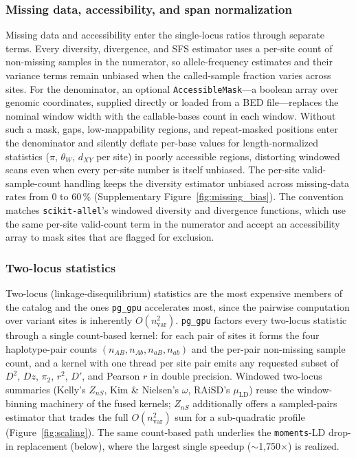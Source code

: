 \documentclass[12pt]{article}
\newcommand{\pggpu}{\texttt{pg\_gpu}\xspace}
\newcommand{\scikitallel}{\texttt{scikit-allel}\xspace}
\newcommand{\moments}{\texttt{moments}\xspace}
\begin{document}
\subsubsection*{Missing data, accessibility, and span normalization}

Missing data and accessibility enter the single-locus ratios through
separate terms. Every diversity, divergence, and SFS estimator uses a
per-site count of non-missing samples in the numerator, so
allele-frequency estimates and their variance terms remain unbiased
when the called-sample fraction varies across sites. For the
denominator, an optional \texttt{AccessibleMask}---a boolean array over
genomic coordinates, supplied directly or loaded from a BED
file---replaces the nominal window width with the callable-bases count
in each window. Without such a mask, gaps, low-mappability regions, and
repeat-masked positions enter the denominator and silently deflate
per-base values for length-normalized statistics ($\pi$, $\theta_W$,
$d_{XY}$ per site) in poorly accessible regions, distorting windowed
scans even when every per-site number is itself unbiased. The per-site
valid-sample-count handling keeps the diversity estimator unbiased
across missing-data rates from 0 to 60\,\% (Supplementary
Figure~\ref{fig:missing_bias}). The convention matches
\scikitallel's windowed diversity and divergence functions, which
use the same per-site valid-count term in the numerator and accept
an accessibility array to mask sites that are flagged for exclusion.

\subsubsection*{Two-locus statistics}

Two-locus (linkage-disequilibrium) statistics are the most expensive
members of the catalog and the ones \pggpu accelerates most, since the
pairwise computation over variant sites is inherently
$O(n_{\mathrm{var}}^2)$. \pggpu factors every two-locus statistic
through a single count-based kernel: for each pair of sites it forms
the four haplotype-pair counts $(n_{AB}, n_{Ab}, n_{aB}, n_{ab})$ and
the per-pair non-missing sample count, and a kernel with one thread per
site pair emits any requested subset of $D^2$, $Dz$, $\pi_2$, $r^2$,
$D'$, and Pearson $r$ in double precision. Windowed two-locus summaries
(Kelly's $Z_{nS}$, Kim \& Nielsen's $\omega$, RAiSD's $\mu_{\mathrm{LD}}$)
reuse the window-binning machinery of the fused kernels; $Z_{nS}$
additionally offers a sampled-pairs estimator that trades the full
$O(n_{\mathrm{var}}^2)$ sum for a sub-quadratic profile
(Figure~\ref{fig:scaling}). The same count-based path underlies the
\moments-LD drop-in replacement (below), where the largest single
speedup ($\sim$1{,}750$\times$) is realized.
\end{document}
